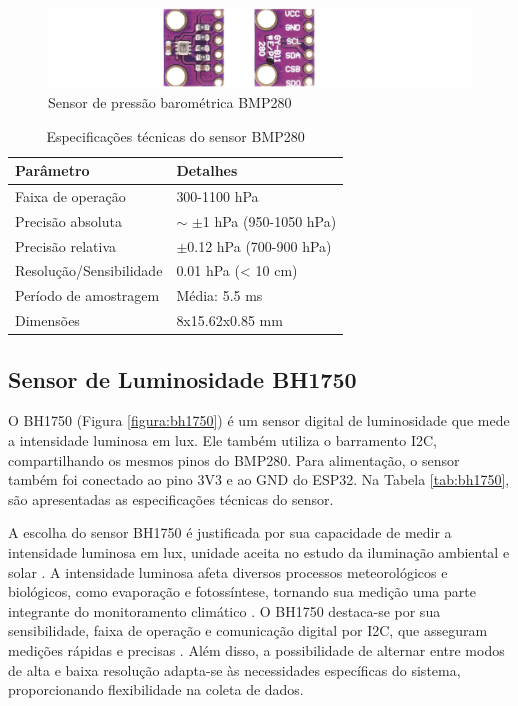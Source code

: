 \begin{figure}[!htb] \centering
  \caption{Sensor de pressão barométrica BMP280} \label{figura:bmp280}
  \begin{varwidth}{\linewidth}
    \includegraphics[width=16cm]{figuras/BMP280.png}
  \end{varwidth}
\end{figure}

\begin{table}[!htb]
  \caption{Especificações técnicas do sensor BMP280}
  \begin{tabularx}{\textwidth}{|X|X|} \hline
      \textbf{Parâmetro} & \textbf{Detalhes} \\ \hline
      Faixa de operação & 300-1100 hPa \\ \hline
      Precisão absoluta & $\sim$ $\pm$1 hPa (950-1050 hPa) \\ \hline
      Precisão relativa & $\pm$0.12 hPa (700-900 hPa) \\ \hline
      Resolução/Sensibilidade & 0.01 hPa (< 10 cm) \\ \hline
      Período de amostragem & Média: 5.5 ms \\ \hline
      Dimensões & 8x15.62x0.85 mm \\ \hline
  \end{tabularx}
  \label{tab:bmp280}
\end{table}

\subsection{Sensor de Luminosidade BH1750}

O BH1750 (Figura \ref{figura:bh1750}) é um sensor digital de luminosidade que mede a intensidade luminosa em lux. Ele também utiliza o barramento I2C, compartilhando os mesmos pinos do BMP280. Para alimentação, o sensor também foi conectado ao pino 3V3 e ao GND do ESP32. Na Tabela \ref{tab:bh1750}, são apresentadas as especificações técnicas do sensor.

A escolha do sensor BH1750 é justificada por sua capacidade de medir a intensidade luminosa em lux, unidade aceita no estudo da iluminação ambiental e solar \parencite{Prathibha_system2017,Vijh_system2024, Amine_system2024}. A intensidade luminosa afeta diversos processos meteorológicos e biológicos, como evaporação e fotossíntese, tornando sua medição uma parte integrante do monitoramento climático \parencite{Yang_evapotranspiration_med2022}. O BH1750 destaca-se por sua sensibilidade, faixa de operação e comunicação digital por I2C, que asseguram medições rápidas e precisas \parencite{BH1750}. Além disso, a possibilidade de alternar entre modos de alta e baixa resolução adapta-se às necessidades específicas do sistema, proporcionando flexibilidade na coleta de dados.

